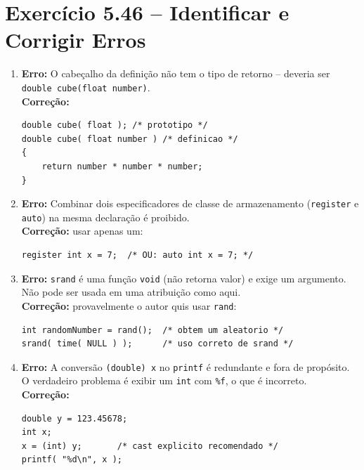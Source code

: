 \documentclass[12pt,a4paper]{article}
\begin{document}
\newpage

\section{Exercício 5.46 -- Identificar e Corrigir Erros}

\begin{respostabox}
\begin{enumerate}[label=\textbf{\alph*)}]

\item \textbf{Erro:} O cabeçalho da definição não tem o tipo de retorno -- deveria
ser \texttt{double cube(float number)}.\\
\textbf{Correção:}
\begin{lstlisting}
double cube( float ); /* prototipo */
double cube( float number ) /* definicao */
{
    return number * number * number;
}
\end{lstlisting}

\item \textbf{Erro:} Combinar dois especificadores de classe de armazenamento
(\texttt{register} e \texttt{auto}) na mesma declaração é proibido.\\
\textbf{Correção:} usar apenas um:
\begin{lstlisting}
register int x = 7;  /* OU: auto int x = 7; */
\end{lstlisting}

\item \textbf{Erro:} \texttt{srand} é uma função \texttt{void} (não retorna valor)
e exige um argumento. Não pode ser usada em uma atribuição como aqui.\\
\textbf{Correção:} provavelmente o autor quis usar \texttt{rand}:
\begin{lstlisting}
int randomNumber = rand();  /* obtem um aleatorio */
srand( time( NULL ) );      /* uso correto de srand */
\end{lstlisting}

\item \textbf{Erro:} A conversão \texttt{(double) x} no \texttt{printf} é redundante
e fora de propósito. O verdadeiro problema é exibir um \texttt{int} com \texttt{\%f},
o que é incorreto.\\
\textbf{Correção:}
\begin{lstlisting}
double y = 123.45678;
int x;
x = (int) y;       /* cast explicito recomendado */
printf( "%d\n", x );
\end{lstlisting}


\end{enumerate}
\end{respostabox}
\end{document}
